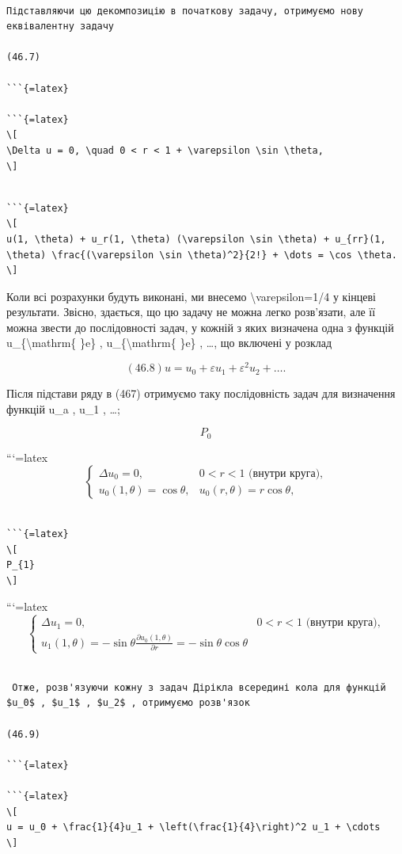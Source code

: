 \documentclass[
]{article}
\begin{document}
\begin{verbatim}

Підставляючи цю декомпозицію в початкову задачу, отримуємо нову еквівалентну задачу

(46.7)

```{=latex}

```{=latex}
\[
\Delta u = 0, \quad 0 < r < 1 + \varepsilon \sin \theta,
\]
\end{verbatim}

\begin{verbatim}

```{=latex}
\[
u(1, \theta) + u_r(1, \theta) (\varepsilon \sin \theta) + u_{rr}(1, \theta) \frac{(\varepsilon \sin \theta)^2}{2!} + \dots = \cos \theta.
\]
\end{verbatim}

Коли всі розрахунки будуть виконані, ми внесемо
\textbackslash varepsilon=1/4 у кінцеві результати. Звісно, здається, що
цю задачу не можна легко розв'язати, але її можна звести до
послідовності задач, у кожній з яких визначена одна з функцій
u\_\{\textbackslash mathrm\{ \}e\} , u\_\{\textbackslash mathrm\{ \}e\}
, \ldots, що включені у розклад

\[
(46.8) u = u_0 + \varepsilon u_1 + \varepsilon^2 u_2 + \dots.
\]

Після підстави ряду в (467) отримуємо таку послідовність задач для
визначення функцій u\_a , u\_1 , \ldots;

\[
P_{0}
\]

```{=latex}
\[
\begin{cases} \Delta u_{0} = 0, & 0 < r < 1 \text{ (внутри круга),} \\ u_{0}(1, \theta) = \cos \theta, & u_{0}(r, \theta) = r \cos \theta, \end{cases}
\]

\begin{verbatim}

```{=latex}
\[
P_{1}
\]
\end{verbatim}

```{=latex}
\[
\begin{cases} \Delta u_{1} = 0, & 0 < r < 1 \text{ (внутри круга),} \\ u_{1}(1, \theta) = -\sin \theta \frac{\partial u_{0}(1, \theta)}{\partial r} = -\sin \theta \cos \theta \end{cases}
\]

\begin{verbatim}

 Отже, розв'язуючи кожну з задач Дірікла всередині кола для функцій $u_0$ , $u_1$ , $u_2$ , отримуємо розв'язок

(46.9)

```{=latex}

```{=latex}
\[
u = u_0 + \frac{1}{4}u_1 + \left(\frac{1}{4}\right)^2 u_1 + \cdots
\]
\end{verbatim}
\end{document}
